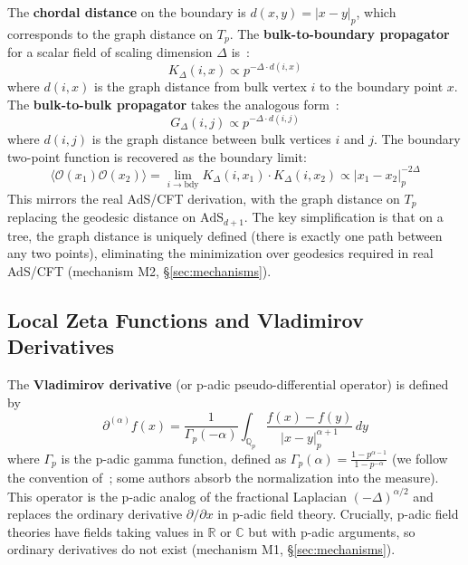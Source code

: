 \documentclass[11pt,a4paper]{article}
\newcommand{\Qp}{\mathbb{Q}_p}
\newcommand{\R}{\mathbb{R}}
\newcommand{\C}{\mathbb{C}}
\newcommand{\Tp}{T_p}
\newcommand{\AdS}{\mathrm{AdS}}
\newcommand{\dpartial}{\partial^{(\alpha)}}
\newcommand{\OO}{\mathcal{O}}
\newcommand{\GG}{G_\Delta}
\newcommand{\KK}{K_\Delta}
\newcommand{\normp}[1]{|#1|_p}
\begin{document}
The \textbf{chordal distance} on the boundary is $d(x,y) = \normp{x-y}$, which corresponds to the graph distance on $\Tp$. The \textbf{bulk-to-boundary propagator} for a scalar field of scaling dimension $\Delta$ is~\cite{G16,HMSS16}:
\begin{equation}
\KK(i, x) \propto p^{-\Delta \cdot d(i, x)}
\end{equation}
where $d(i,x)$ is the graph distance from bulk vertex $i$ to the boundary point $x$. The \textbf{bulk-to-bulk propagator} takes the analogous form~\cite{GP17}:
\begin{equation}
\GG(i, j) \propto p^{-\Delta \cdot d(i, j)}
\end{equation}
where $d(i,j)$ is the graph distance between bulk vertices $i$ and $j$. The boundary two-point function is recovered as the boundary limit:
\begin{equation}
\langle \OO(x_1) \OO(x_2) \rangle = \lim_{i \to \mathrm{bdy}} \KK(i, x_1) \cdot \KK(i, x_2) \propto \normp{x_1 - x_2}^{-2\Delta}
\end{equation}
This mirrors the real AdS/CFT derivation, with the graph distance on $\Tp$ replacing the geodesic distance on $\AdS_{d+1}$. The key simplification is that on a tree, the graph distance is uniquely defined (there is exactly one path between any two points), eliminating the minimization over geodesics required in real AdS/CFT (mechanism M2, \S\ref{sec:mechanisms}).

\subsection{Local Zeta Functions and Vladimirov Derivatives}

The \textbf{Vladimirov derivative} (or p-adic pseudo-differential operator) is defined by
\begin{equation}
\dpartial f(x) = \frac{1}{\Gamma_p(-\alpha)} \int_{\Qp} \frac{f(x) - f(y)}{\normp{x-y}^{\alpha+1}} \, dy
\end{equation}
where $\Gamma_p$ is the p-adic gamma function, defined as $\Gamma_p(\alpha) = \frac{1 - p^{\alpha-1}}{1 - p^{-\alpha}}$ (we follow the convention of~\cite{HSYZ20}; some authors absorb the normalization into the measure). This operator is the p-adic analog of the fractional Laplacian $(-\Delta)^{\alpha/2}$ and replaces the ordinary derivative $\partial/\partial x$ in p-adic field theory. Crucially, p-adic field theories have fields taking values in $\R$ or $\C$ but with p-adic arguments, so ordinary derivatives do not exist (mechanism M1, \S\ref{sec:mechanisms}).
\end{document}
